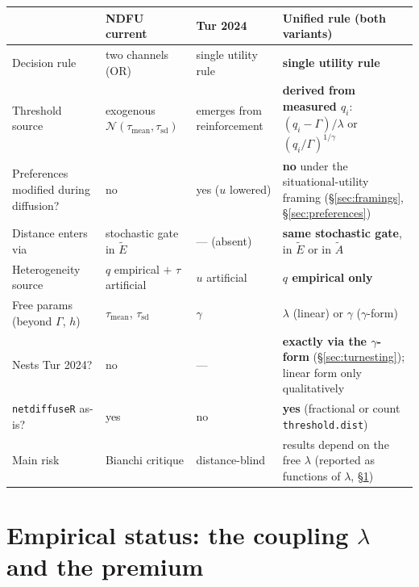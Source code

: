 \documentclass[11pt,a4paper]{article}
\newcommand{\Ee}{\tilde{E}}                 %
\newcommand{\Acount}{\tilde{A}}             %
\newcommand{\code}[1]{\texttt{#1}}
\begin{document}
\begin{center}
\footnotesize
\setlength{\tabcolsep}{4pt}
\begin{tabularx}{\textwidth}{@{}l>{\raggedright\arraybackslash}p{3.2cm}>{\raggedright\arraybackslash}p{3.2cm}>{\raggedright\arraybackslash}X@{}}
\toprule
 & NDFU current & Tur 2024 & \textbf{Unified rule (both variants)} \\
\midrule
Decision rule & two channels (OR) & single utility rule & \textbf{single utility rule} \\
Threshold source & exogenous $\mathcal{N}(\tau_{\text{mean}}, \tau_{\text{sd}})$ & emerges from reinforcement & \textbf{derived from measured $q_i$}: $(q_i - \Gamma)/\lambda$ or $(q_i/\Gamma)^{1/\gamma}$ \\
Preferences modified during diffusion? & no & yes ($u$ lowered) & \textbf{no} under the situational-utility framing (\S\ref{sec:framings}, \S\ref{sec:preferences}) \\
Distance enters via & stochastic gate in $\Ee$ & --- (absent) & \textbf{same stochastic gate}, in $\Ee$ or in $\Acount$ \\
Heterogeneity source & $q$ empirical $+$ $\tau$ artificial & $u$ artificial & \textbf{$q$ empirical only} \\
Free params (beyond $\Gamma$, $h$) & $\tau_{\text{mean}}$, $\tau_{\text{sd}}$ & $\gamma$ & $\lambda$ (linear) or $\gamma$ ($\gamma$-form) \\
Nests Tur 2024? & no & --- & \textbf{exactly via the $\gamma$-form} (\S\ref{sec:turnesting}); linear form only qualitatively \\
\code{netdiffuseR} as-is? & yes & no & \textbf{yes} (fractional or count \code{threshold.dist}) \\
Main risk & Bianchi critique & distance-blind & results depend on the free $\lambda$ (reported as functions of $\lambda$, \S\ref{sec:calibration}) \\
\bottomrule
\end{tabularx}
\end{center}

\section{Empirical status: the coupling \texorpdfstring{$\lambda$}{lambda} and the premium}
\label{sec:calibration}
\end{document}
